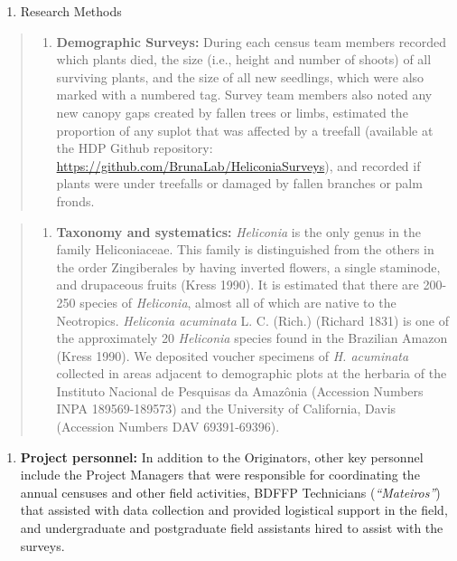 \documentclass[
  12pt,
  man, donotrepeattitle,floatsintext]{apa6}
\providecommand{\tightlist}{%
  \setlength{\itemsep}{0pt}\setlength{\parskip}{0pt}}
\begin{document}
\begin{enumerate}
\def\labelenumi{\arabic{enumi}.}
\setcounter{enumi}{2}
\tightlist
\item
  Research Methods
\end{enumerate}

\begin{quote}
\begin{enumerate}
\def\labelenumi{\alph{enumi}.}
\tightlist
\item
  \textbf{Demographic Surveys:} During each census team members recorded which plants died, the size (i.e., height and number of shoots) of all surviving plants, and the size of all new seedlings, which were also marked with a numbered tag. Survey team members also noted any new canopy gaps created by fallen trees or limbs, estimated the proportion of any suplot that was affected by a treefall (available at the HDP Github repository: \url{https://github.com/BrunaLab/HeliconiaSurveys}), and recorded if plants were under treefalls or damaged by fallen branches or palm fronds.
\end{enumerate}
\end{quote}

\begin{quote}
\begin{enumerate}
\def\labelenumi{\alph{enumi}.}
\setcounter{enumi}{1}
\tightlist
\item
  \textbf{Taxonomy and systematics:} \emph{Heliconia} is the only genus in the family Heliconiaceae. This family is distinguished from the others in the order Zingiberales by having inverted flowers, a single staminode, and drupaceous fruits (Kress 1990). It is estimated that there are 200-250 species of \emph{Heliconia}, almost all of which are native to the Neotropics. \emph{Heliconia acuminata} L. C. (Rich.) (Richard 1831) is one of the approximately 20 \emph{Heliconia} species found in the Brazilian Amazon (Kress 1990). We deposited voucher specimens of \emph{H. acuminata} collected in areas adjacent to demographic plots at the herbaria of the Instituto Nacional de Pesquisas da Amazônia (Accession Numbers INPA 189569-189573) and the University of California, Davis (Accession Numbers DAV 69391-69396).
\end{enumerate}
\end{quote}

\begin{enumerate}
\def\labelenumi{\arabic{enumi}.}
\setcounter{enumi}{3}
\tightlist
\item
  \textbf{Project personnel:} In addition to the Originators, other key personnel include the Project Managers that were responsible for coordinating the annual censuses and other field activities, BDFFP Technicians (\emph{``Mateiros''}) that assisted with data collection and provided logistical support in the field, and undergraduate and postgraduate field assistants hired to assist with the surveys.
\end{enumerate}
\end{document}
